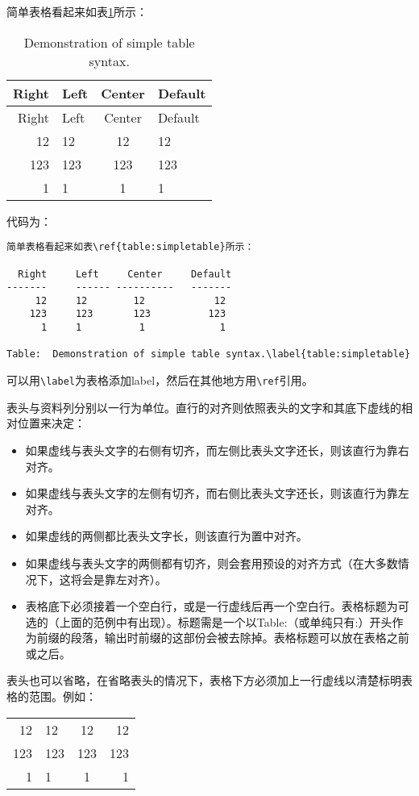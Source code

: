 \documentclass[fancyhdr,bookmark]{ctexbook}
\providecommand{\tightlist}{%
  \setlength{\itemsep}{0pt}\setlength{\parskip}{0pt}}
\begin{document}
简单表格看起来如表\ref{table:simpletable}所示：

\begin{longtable}[]{@{}rlcl@{}}
\caption{Demonstration of simple table
syntax.\label{table:simpletable}}\tabularnewline
\toprule
Right & Left & Center & Default\tabularnewline
\midrule
\endfirsthead
\toprule
Right & Left & Center & Default\tabularnewline
\midrule
\endhead
12 & 12 & 12 & 12\tabularnewline
123 & 123 & 123 & 123\tabularnewline
1 & 1 & 1 & 1\tabularnewline
\bottomrule
\end{longtable}

代码为：

\begin{lstlisting}
简单表格看起来如表\ref{table:simpletable}所示：

  Right     Left     Center     Default
-------     ------ ----------   -------
     12     12        12            12
    123     123       123          123
      1     1          1             1

Table:  Demonstration of simple table syntax.\label{table:simpletable}
\end{lstlisting}

可以用\lstinline!\label!为表格添加label，然后在其他地方用\lstinline!\ref!引用。

表头与资料列分别以一行为单位。直行的对齐则依照表头的文字和其底下虚线的相对位置来决定：

\begin{itemize}
\tightlist
\item
  如果虚线与表头文字的右侧有切齐，而左侧比表头文字还长，则该直行为靠右对齐。
\item
  如果虚线与表头文字的左侧有切齐，而右侧比表头文字还长，则该直行为靠左对齐。
\item
  如果虚线的两侧都比表头文字长，则该直行为置中对齐。
\item
  如果虚线与表头文字的两侧都有切齐，则会套用预设的对齐方式（在大多数情况下，这将会是靠左对齐）。
\item
  表格底下必须接着一个空白行，或是一行虚线后再一个空白行。表格标题为可选的（上面的范例中有出现）。标题需是一个以Table:（或单纯只有:）开头作为前缀的段落，输出时前缀的这部份会被去除掉。表格标题可以放在表格之前或之后。
\end{itemize}

表头也可以省略，在省略表头的情况下，表格下方必须加上一行虚线以清楚标明表格的范围。例如：

\begin{longtable}[]{@{}rlcr@{}}
\toprule
12 & 12 & 12 & 12\tabularnewline
123 & 123 & 123 & 123\tabularnewline
1 & 1 & 1 & 1\tabularnewline
\bottomrule
\end{longtable}
\end{document}
